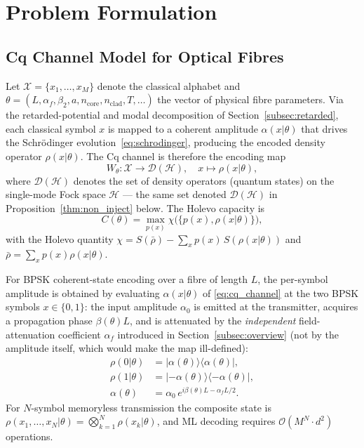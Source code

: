 \documentclass[journal,twocolumn]{IEEEtran}
\theoremstyle{definition}
\theoremstyle{plain}
\newcommand{\calH}{\mathcal{H}}
\newcommand{\alphaf}{\alpha_{f}}
\begin{document}
\section{Problem Formulation}
\label{sec:problem}

\subsection{Cq Channel Model for Optical Fibres}

Let $\mathcal{X} = \{x_1, \dots, x_M\}$ denote the classical
alphabet and $\theta = (L, \alphaf, \beta_2, a, n_{\mathrm{core}},
n_{\mathrm{clad}}, T, \ldots)$ the vector of physical fibre
parameters.  Via the retarded-potential and modal decomposition of
Section~\ref{subsec:retarded}, each classical symbol $x$ is mapped
to a coherent amplitude $\alpha(x|\theta)$ that drives the
Schr\"{o}dinger evolution~\eqref{eq:schrodinger}, producing the
encoded density operator $\rho(x|\theta)$.  The Cq channel is
therefore the encoding map
\begin{equation}
  W_\theta : \mathcal{X} \to \mathcal{D}(\calH), \quad
  x \mapsto \rho(x|\theta),
  \label{eq:cq_channel}
\end{equation}
where $\mathcal{D}(\calH)$ denotes the set of density operators
(quantum states) on the single-mode Fock space $\calH$ --- the same
set denoted $\mathcal{D}(\calH)$ in Proposition~\ref{thm:non_inject}
below. The Holevo capacity is
\begin{equation}
  C(\theta) = \max_{p(x)} \chi\bigl(\{p(x), \rho(x|\theta)\}\bigr),
  \label{eq:holevo_capacity}
\end{equation}
with the Holevo quantity
$\chi = S(\bar\rho) - \sum_x p(x)\, S(\rho(x|\theta))$ and
$\bar\rho = \sum_x p(x)\rho(x|\theta)$.

For BPSK coherent-state encoding over a fibre of length $L$, the
per-symbol amplitude is obtained by evaluating $\alpha(x|\theta)$ of
\eqref{eq:cq_channel} at the two BPSK symbols $x\in\{0,1\}$: the
input amplitude $\alpha_0$ is emitted at the transmitter, acquires a
propagation phase $\beta(\theta)L$, and is attenuated by the
\emph{independent} field-attenuation coefficient $\alphaf$ introduced
in Section~\ref{subsec:overview} (not by the amplitude itself, which
would make the map ill-defined):
\begin{align}
  \rho(0|\theta) &= |\alpha(\theta)\rangle\langle\alpha(\theta)|,
  \nonumber\\
  \rho(1|\theta) &= |-\alpha(\theta)\rangle\langle-\alpha(\theta)|,
  \label{eq:bpsk}\\
  \alpha(\theta) &= \alpha_0\,e^{i\beta(\theta)L - \alphaf L/2}.
  \nonumber
\end{align}
For $N$-symbol memoryless transmission the composite state is
$\rho(x_1,\dots,x_N|\theta) = \bigotimes_{k=1}^N \rho(x_k|\theta)$,
and ML decoding requires $\mathcal{O}(M^N \cdot d^2)$ operations.
\end{document}
